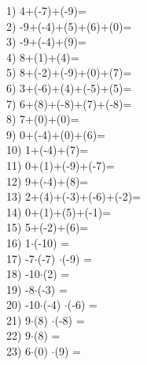 \documentclass[a4paper,10pt]{article}
\begin{document}
1)   4+(-7)+(-9)=
\vspace{0.5cm}\\2)   -9+(-4)+(5)+(6)+(0)=
\vspace{0.5cm}\\3)   -9+(-4)+(9)=
\vspace{0.5cm}\\4)   8+(1)+(4)=
\vspace{0.5cm}\\5)   8+(-2)+(-9)+(0)+(7)=
\vspace{0.5cm}\\6)   3+(-6)+(4)+(-5)+(5)=
\vspace{0.5cm}\\7)   6+(8)+(-8)+(7)+(-8)=
\vspace{0.5cm}\\8)   7+(0)+(0)=
\vspace{0.5cm}\\9)   0+(-4)+(0)+(6)=
\vspace{0.5cm}\\10)   1+(-4)+(7)=
\vspace{0.5cm}\\11)   0+(1)+(-9)+(-7)=
\vspace{0.5cm}\\12)   9+(-4)+(8)=
\vspace{0.5cm}\\13)   2+(4)+(-3)+(-6)+(-2)=
\vspace{0.5cm}\\14)   0+(1)+(5)+(-1)=
\vspace{0.5cm}\\15)   5+(-2)+(6)=
\vspace{0.5cm}\\16)   1$\cdot$(-10) =
\vspace{0.5cm}\\17)   -7$\cdot$(-7) $\cdot$(-9) =
\vspace{0.5cm}\\18)   -10$\cdot$(2) =
\vspace{0.5cm}\\19)   -8$\cdot$(-3) =
\vspace{0.5cm}\\20)   -10$\cdot$(-4) $\cdot$(-6) =
\vspace{0.5cm}\\21)   9$\cdot$(8) $\cdot$(-8) =
\vspace{0.5cm}\\22)   9$\cdot$(8) =
\vspace{0.5cm}\\23)   6$\cdot$(0) $\cdot$(9) =
\end{document}
